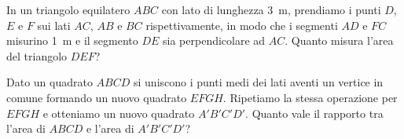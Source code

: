 \begin{multicols}{2}
\begin{esercizio}
\label{ese:7.112}
In un triangolo equilatero \(ABC\) con lato di lunghezza 3~m, prendiamo 
i punti \(D\), \(E\) e \(F\) sui lati \(AC\), \(AB\) e \(BC\) rispettivamente, in 
modo che i segmenti \(AD\) e \(FC\) misurino 1~m e il segmento \(DE\) sia 
perpendicolare ad \(AC\). Quanto misura l'area del triangolo \(DEF\)?
\end{esercizio}

%

\begin{esercizio}
\label{ese:7.113}
Dato un quadrato \(ABCD\) si uniscono i punti medi dei lati aventi un 
vertice in comune formando un nuovo quadrato \(EFGH\). Ripetiamo la 
stessa operazione per \(EFGH\) e otteniamo un nuovo quadrato 
\(A'B'C'D'\). Quanto vale il rapporto tra l'area di \(ABCD\) e l'area di 
\(A'B'C'D'\)?
\end{esercizio}

\end{multicols}

